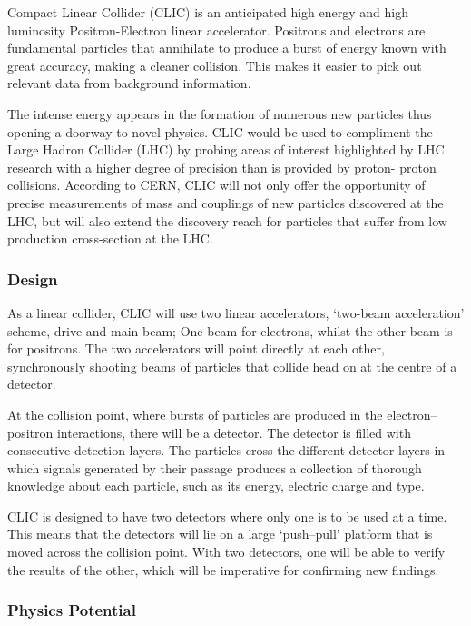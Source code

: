 Compact Linear Collider (CLIC) is an anticipated high energy and high luminosity Positron-Electron linear accelerator. Positrons and electrons are fundamental particles that annihilate to produce a burst of energy known with great accuracy, making a cleaner collision. This makes it easier to pick out relevant data from background information.

The intense energy appears in the formation of numerous new particles thus opening a doorway to novel physics. CLIC would be used to compliment the Large Hadron Collider (LHC) by probing areas of interest highlighted by LHC research with a higher degree of precision than is provided by proton- proton collisions. According to CERN, CLIC will not only offer the opportunity of precise measurements of mass and couplings of new particles discovered at the LHC, but will also extend the discovery reach for particles that suffer from low production cross-section at the LHC. \cite{LHC:CP:Higgs}

\subsubsection{Design}

As a linear collider, CLIC will use two linear accelerators, ‘two-beam acceleration’ scheme, drive and main beam; One beam for electrons, whilst the other beam is for positrons. The two accelerators will point directly at each other, synchronously shooting beams of particles that collide head on at the centre of a detector. %

At the collision point, where bursts of particles are produced in the electron–positron interactions, there will be a detector. The detector is filled with consecutive detection layers. The particles cross the different detector layers in which signals generated by their passage produces a collection of thorough knowledge about each particle, such as its energy, electric charge and type.

CLIC is designed to have two detectors where only one is to be used at a time. This means that the detectors will lie on a large ‘push–pull’ platform that is moved across the collision point. With two detectors, one will be able to verify the results of the other, which will be imperative for confirming new findings.

\subsubsection{Physics Potential}
 
